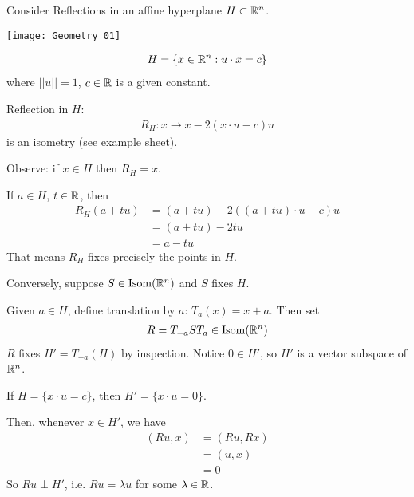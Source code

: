\documentclass[a4paper]{article}
\begin{document}
\begin{eg}

Consider Reflections in an affine hyperplane $H \subset \mathbb{R}^n$.

\texttt{[image: Geometry\_01]}

\begin{equation*}
\begin{aligned}
H=\{x \in \mathbb{R}^n: u \cdot x = c\}
\end{aligned}
\end{equation*}
where $||u||=1$, $c \in \mathbb{R}$ is a given constant.

Reflection in $H$:
\begin{equation*}
\begin{aligned}
R_H: x \to x-2(x\cdot u-c)u
\end{aligned}
\end{equation*}
is an isometry (see example sheet).

Observe: if $x \in H$ then $R_H = x$.

If $a \in H$, $t \in \mathbb{R}$, then
\begin{equation*}
\begin{aligned}
R_H(a+tu) &= (a+tu)-2((a+tu)\cdot u-c)u\\
&=(a+tu)-2tu\\
&=a-tu
\end{aligned}
\end{equation*}
That means $R_H$ fixes precisely the points in $H$.

Conversely, suppose $S \in \operatorname{Isom}(\mathbb{R}^n)$ and $S$ fixes $H$.

Given $a \in H$, define translation by $a$: $T_a(x) = x+a$. Then set
\begin{equation*}
\begin{aligned}
R= T_{-a}ST_a \in \operatorname{Isom}(\mathbb{R}^n)
\end{aligned}
\end{equation*}
$R$ fixes $H' = T_{-a}(H)$ by inspection. Notice $0 \in H'$, so $H'$ is a vector subspace of $\mathbb{R}^n$.

If $H=\{x \cdot u = c\}$, then $H' = \{x \cdot u = 0\}$.

Then, whenever $x \in H'$, we have
\begin{equation*}
\begin{aligned}
(Ru,x) &= (Ru,Rx)\\
&= (u,x)\\
&=0
\end{aligned}
\end{equation*}
So $Ru \perp H'$, i.e. $Ru = \lambda u$ for some $\lambda \in \mathbb{R}$.


\end{eg}
\end{document}
